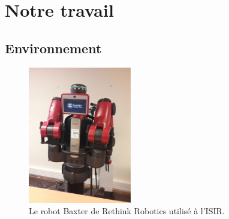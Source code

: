 \documentclass{llncs}
\begin{document}




\section{Notre travail}





\subsection{Environnement}
 

\begin{figure}
  \begin{center}
    \includegraphics[angle=-90, width=0.4\textwidth]{figures/baxter}
  \end{center}
  \caption{Le robot Baxter de Rethink Robotics utilisé à l'ISIR.}
  \label{fig:baxter}
\end{figure}
\end{document}
